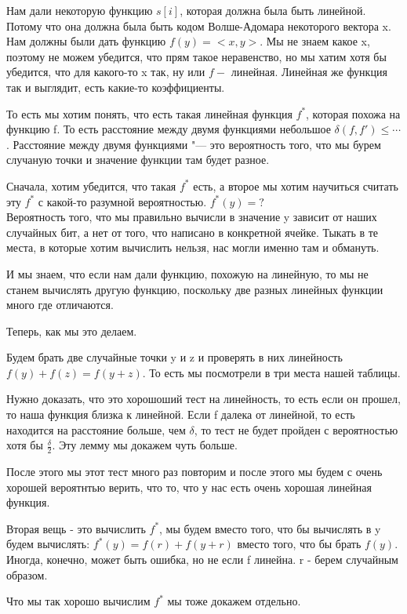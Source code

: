 Нам дали некоторую функцию $s[i]$, которая должна была быть линейной. Потому что она должна была 
быть кодом Волше-Адомара некоторого вектора x. Нам должны были дать функцию $f(y) = <x, y>$.
Мы не знаем какое x, поэтому не можем убедится, что прям такое неравенство, но мы хатим хотя 
бы убедится, что для какого-то x так, ну или $f -$ линейная. Линейная же функция так и выглядит, 
есть какие-то коэффициенты. 

То есть мы хотим понять, что есть такая линейная функция $f^*$, которая похожа на функцию f. 
То есть расстояние между двумя функциями небольшое $\delta(f,f') \le \cdots$. Расстояние между 
двумя функциями "--- это вероятность того, что мы бурем случаную точки и значение 
функции там будет разное. 

Сначала, хотим убедится, что такая $f^*$ есть, а второе мы хотим научиться считать эту $f^*$ с какой-то разумной 
вероятностью.
$f^*(y) = ?$\\

Вероятность того, что мы правильно вычисли в значение y зависит от наших случайных бит, 
а нет от того, что написано в конкретной ячейке. Тыкать в те места, в которые хотим вычислить 
нельзя, нас могли именно там и обмануть. 

И мы знаем, что если нам дали функцию, похожую на линейную, то мы не станем 
вычислять другую функцию, поскольку две разных линейных функции 
много где отличаются.

Теперь, как мы это делаем.  

Будем брать две случайные точки y и z и проверять в них линейность $f(y) + f(z) = f(y + z)$.
То есть мы посмотрели в три места нашей таблицы. 

Нужно доказать, что это хорошоший тест на линейность, то есть если он прошел, 
то наша функция близка к линейной. Если f далека от линейной, то есть находится
на расстояние больше, чем $\delta$, то тест не будет пройден с вероятностью 
хотя бы $\frac{\delta}{2}$. Эту лемму мы докажем чуть больше.

После этого мы этот тест много раз повторим и после этого мы будем с очень хорошей
вероятнтью верить, что то, что у нас есть очень хорошая линейная функция.  
      
Вторая вещь - это вычислить $f^*$, мы будем вместо того, что 
бы вычислять в y будем вычислять: $f^*(y) = f(r) + f(y + r)$
вместо того, что бы брать $f(y)$. Иногда, конечно, может быть ошибка, но не 
если f линейна. r - берем случайным образом.

Что мы так хорошо вычислим $f^*$ мы тоже докажем отдельно.  

